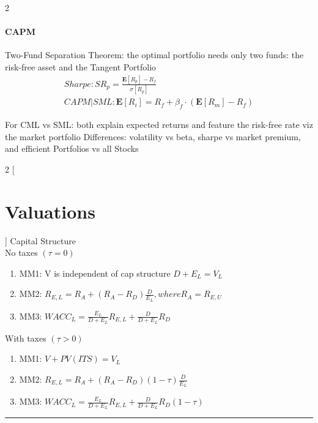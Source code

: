 \documentclass[8pt]{report}
\begin{document}
\begin{multicols}{2}
\paragraph{CAPM}
Two-Fund Separation Theorem: the optimal portfolio needs only two funds: the risk-free asset and the Tangent Portfolio \\

\begin{align*}
Sharpe: SR_p = \frac{\mathbf{E}[R_p] - R_f}{\sigma[R_p]} \\
CAPM | SML: \mathbf{E}[R_i] = R_f + \beta_f \cdot (\mathbf{E}[R_m] - R_f)
\end{align*}

For CML vs SML: both explain expected returns and feature the risk-free rate viz the market portfolio
Differences: volatility vs beta, sharpe vs market premium, and efficient Portfolios vs all Stocks 
\end{multicols}


\begin{multicols}{2}
[
\section{Valuations}
]
Capital Structure \\
No taxes $(\tau=0)$

\begin{enumerate}
	\item MM1: V is independent of cap structure $D+E_L = V_L$ 
	\item MM2: $R_{E,L} = R_A + (R_A-R_D) \frac{D}{E_L}, where R_A=R_{E,U}$ 
	\item MM3: $WACC_L = \frac{E_L}{D+E_L} R_{E,L} + \frac{D}{D+E_L}R_D $
\end{enumerate}

With taxes $(\tau > 0)$ \\
\begin{enumerate}
	\item MM1: $ V+PV(ITS) = V_L$ 
	\item MM2: $R_{E,L} = R_A + (R_A-R_D) (1-\tau) \frac{D}{E_L} $ 
	\item MM3: $WACC_L = \frac{E_L}{D+E_L} R_{E,L} + \frac{D}{D+E_L}R_D(1-\tau) $	
\end{enumerate}

\end{multicols}
\hrule
\end{document}
